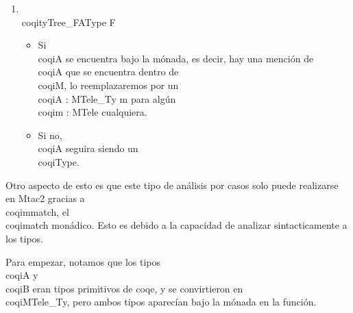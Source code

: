 \begin{enumerate}
\item \\coqi{tyTree_FAType F}
  \begin{itemize}
  \item Si \\coqi{A} se encuentra bajo la mónada, es decir, hay una mención de
    \\coqi{A} que se encuentra dentro de \\coqi{M}, lo reemplazaremos por un
    \\coqi{A : MTele_Ty m} para algún \\coqi{m : MTele} cualquiera.
  \item Si no, \\coqi{A} seguira siendo un \\coqi{Type}.
  \end{itemize}
\end{enumerate}

Otro aspecto de esto es que este tipo de análisis por casos solo puede
realizarse en Mtac2 gracias a \\coqi{mmatch}, el \\coqi{match} monádico. Esto es
debido a la capacidad de analizar sintacticamente a los tipos.

Para empezar, notamos que los tipos \\coqi{A} y \\coqi{B} eran tipos primitivos de
coqe, y se convirtieron en \\coqi{MTele_Ty}, pero ambos tipos aparecían bajo la
mónada en la función.